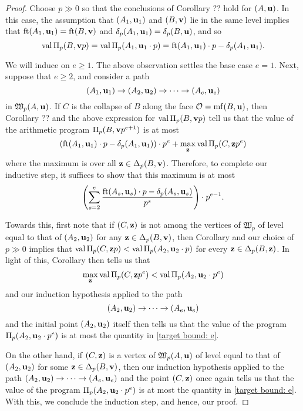 \documentclass[11pt]{amsart}
\begin{document}
\begin{proof}  Choose $p \gg 0$ so that the conclusions of Corollary ?? hold for $(A, \mathbf{u})$.  In this case, the assumption that $(A_1, \mathbf{u}_1)$ and $(B, \mathbf{v})$ lie in the same level implies that $\operatorname{ft}(A_1, \mathbf{u}_1) = \operatorname{ft}(B, \mathbf{v})$ and $\delta_p(A_1, \mathbf{u}_1) = \delta_p(B, \mathbf{u})$, and so 
\[ \operatorname{val} \Pi_p(B, \mathbf{v}p) = \operatorname{val} \Pi_p (A_1, \mathbf{u}_1 \cdot p) = \operatorname{ft}(A_1, \mathbf{u}_1) \cdot p - \delta_p(A_1, \mathbf{u}_1). \] 

We will induce on $e \geq 1$.  The above observation settles the base case $e=1$.  Next, suppose that $e \geq 2$, and consider a path  \[ (A_1, \mathbf{u}_1) \to (A_2, \mathbf{u}_2) \to \cdots \to (A_e, \mathbf{u}_e)\] in $\mathfrak{W}_p(A, \mathbf{u})$.  If $C$ is the collapse of $B$ along the face $\mathcal{O} = \operatorname{mf}(B, \mathbf{u})$, then Corollary ??  and the above expression for $\operatorname{val} \Pi_p(B, \mathbf{v}p)$ tell us that the value of the arithmetic program $\Pi_p(B, \mathbf{v}p^{e+1})$ is at most
%
\[  \left( \operatorname{ft}(A_1, \mathbf{u}_1) \cdot p - \delta_p(A_1, \mathbf{u}_1) \right) \cdot p^e +  \max_{\mathbf{z}} \operatorname{val} \Pi_p(C, \mathbf{z}p^e) \]
%
where the maximum is over all $\mathbf{z} \in \Delta_p(B, \mathbf{v})$.   Therefore, to complete our inductive step, it suffices to show that this maximum is at most
%
\begin{equation}
\label{target bound: e}
\left( \sum_{s=2}^e \frac{ \operatorname{ft}(A_s, \mathbf{u}_s)  \cdot p - \delta_p(A_s, \mathbf{u}_s)}{p^s} \right) \cdot p^{e-1}.  \end{equation}



Towards this, first note that if $(C, \mathbf{z})$ is not among the vertices of $\mathfrak{W}_p$ of level equal to that of $(A_2, \mathbf{u}_2)$ for any $\mathbf{z} \in \Delta_p(B, \mathbf{v})$, then Corollary \!{} and our choice of $p \gg 0$ implies that $\operatorname{val} \Pi_p(C, \mathbf{z}p) < \operatorname{val} \Pi_p(A_2, \mathbf{u}_2 \cdot p)$ for every $\mathbf{z} \in \Delta_p(B, \mathbf{z})$.  In light of this, Corollary \!{} then tells us that 
\[  \max_{\mathbf{z}} \operatorname{val} \Pi_p(C, \mathbf{z}p^e) < \operatorname{val} \Pi_p(A_2, \mathbf{u}_2 \cdot p^e)\]  
and our induction hypothesis applied to the path 
\[ (A_2, \mathbf{u}_2) \to \cdots \to (A_e, \mathbf{u}_e) \] and the initial point $(A_2, \mathbf{u}_2)$ itself then tells us that the value of the program $\Pi_p(A_2, \mathbf{u}_2 \cdot p^e)$ is at most the quantity in \eqref{target bound: e}.  

On the other hand, if $(C, \mathbf{z})$ is a vertex of $\mathfrak{W}_p(A, \mathbf{u})$ of level equal to that of $(A_2, \mathbf{u}_2)$ for some $\mathbf{z} \in \Delta_p(B, \mathbf{v})$, then our induction hypothesis applied to the path 
$(A_2, \mathbf{u}_2) \to \cdots \to (A_e, \mathbf{u}_e)$ and the point $(C, \mathbf{z})$ once again tells us that the value of the program $\Pi_p(A_2, \mathbf{u}_2 \cdot p^e)$ is at most the quantity in \eqref{target bound: e}.  With this, we conclude the induction step, and hence, our proof. 
\end{proof}
\end{document}
